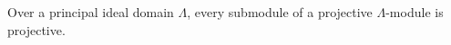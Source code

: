 Over a principal ideal domain $\Lambda$, every submodule of a projective $\Lambda$-module is projective.
